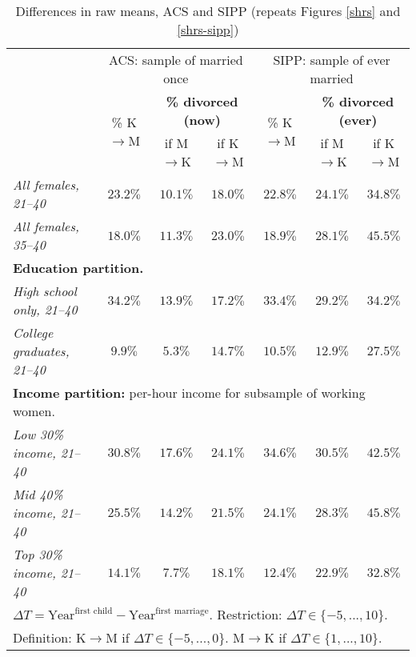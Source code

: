 \documentclass[12pt,letter]{article}
\begin{document}
\begin{table}[p]
\begin{center}
\begin{tabular}{|l|c||c|c||c||c|c|}\cline{2-7}
\multicolumn{1}{c|}{} & \multicolumn{3}{c||}{\small ACS: sample of married once} & \multicolumn{3}{c|}{\small SIPP: sample of  ever married} \\\cline{2-7}
\multicolumn{1}{c|}{}  & \multirow{2}{*}{\small \% K$\to$M}& \multicolumn{2}{c||}{\textbf{\% divorced (now)}} & \multirow{2}{*}{\footnotesize \% K$\to$M }& \multicolumn{2}{c|}{\textbf{\% divorced (ever)}} \\\cline{3-4}\cline{6-7}
\multicolumn{1}{c|}{}  &  &\small if M$\to$K &  \small if K$\to$M & & \small if M$\to$K & \small if K$\to$M \\\hline
\textit{All females, 21--40}  & $23.2\%$ & $10.1\%$ & $18.0\%$ & $22.8\%$ & $24.1\%$ & $34.8\%$ \\
\textit{All females, 35--40} & $18.0\%$ & $11.3\%$ & $23.0\%$ & $18.9\%$ & $28.1\%$ & $45.5\%$ \\\hline\hline
\multicolumn{7}{|p{0.9\linewidth}|}{\footnotesize \textbf{Education partition.}}\\\hline
\textit{High school only, 21--40} & $34.2\%$ & $13.9\%$ & $17.2\%$ & $33.4\%$ & $29.2\%$  & $34.2\%$ \\
\textit{College graduates, 21--40} & $9.9\%$ & $5.3\%$ & $14.7\%$ & $10.5\%$ & $12.9\%$ & $27.5\%$ \\\hline\hline
\multicolumn{7}{|p{0.9\linewidth}|}{\footnotesize \textbf{Income partition:} per-hour income for subsample of working women.}\\\hline
\textit{Low 30\% income, 21--40} & $30.8\%$ & $17.6\%$ & $24.1\%$ & $34.6\%$ & $30.5\%$ &  $42.5\%$ \\
\textit{Mid 40\% income, 21--40} & $25.5\%$ & $14.2\%$ & $21.5\%$ & $24.1\%$ & $28.3\%$ & $45.8\%$ \\
\textit{Top 30\% income, 21--40} & $14.1\%$ & $7.7\%$ & $18.1\%$ & $12.4\%$ & $22.9\%$  & $32.8\%$ \\\hline
\multicolumn{7}{|p{0.9\linewidth}|}{\footnotesize $\Delta T = \text{Year}^{\text{first child}} - \text{Year}^{\text{first marriage}}$. Restriction: $\Delta T \in \{-5,...,10\}$.}\\
\multicolumn{7}{|p{0.9\linewidth}|}{\footnotesize Definition: K$\to$M if $\Delta T \in \{-5,...,0\}$. M$\to$K if $\Delta T \in \{1,...,10\}$.}\\
\hline
\end{tabular}
\caption{Differences in raw means, ACS and SIPP (repeats Figures \ref{shrs} and \ref{shrs-sipp}) \label{diff-raw}}
\end{center}
\end{table}
\end{document}
